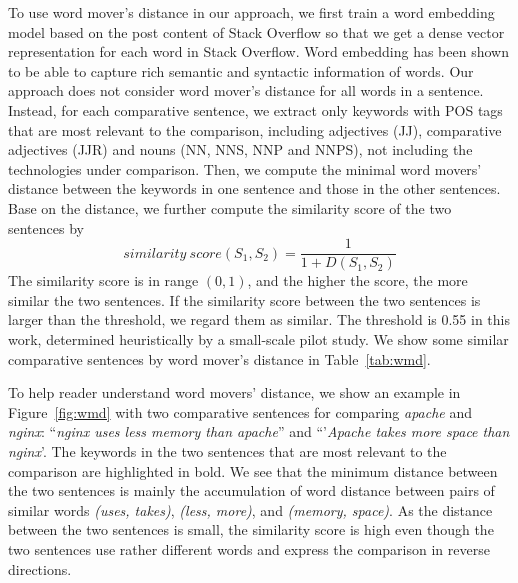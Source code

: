 To use word mover's distance in our approach, we first train a word embedding model based on the post content of Stack Overflow so that we get a dense vector representation for each word in Stack Overflow.
Word embedding has been shown to be able to capture rich semantic and syntactic information of words.
Our approach does not consider word mover's distance for all words in a sentence.
Instead, for each comparative sentence, we extract only keywords with POS tags that are most relevant to the comparison, including adjectives (JJ), comparative adjectives (JJR) and nouns (NN, NNS, NNP and NNPS), not including the technologies under comparison. 
Then, we compute the minimal word movers' distance between the keywords in one sentence and those in the other sentences.
Base on the distance, we further compute the similarity score of the two sentences by 
$$ similarity \ score (S_1, S_2) = \frac{1}{1+D(S_1, S_2)} $$
The similarity score is in range $(0, 1)$, and the higher the score, the more similar the two sentences.
If the similarity score between the two sentences is larger than the threshold, we regard them as similar.
The threshold is 0.55 in this work, determined heuristically by a small-scale pilot study. 
We show some similar comparative sentences by word mover's distance in Table~\ref{tab:wmd}.

To help reader understand word movers' distance, we show an example in Figure~\ref{fig:wmd} with two comparative sentences for comparing \textit{apache} and \textit{nginx}: ``\textit{nginx uses less memory than apache}'' and ``'\textit{Apache takes more space than nginx}'.
The keywords in the two sentences that are most relevant to the comparison are highlighted in bold.
We see that the minimum distance between the two sentences is mainly the accumulation of word distance between pairs of similar words \textit{(uses, takes)}, \textit{(less, more)}, and \textit{(memory, space)}. 
As the distance between the two sentences is small, the similarity score is high even though the two sentences use rather different words and express the comparison in reverse directions.

